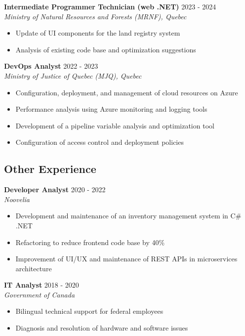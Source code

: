 ﻿\documentclass[11pt,letterpaper]{article}
\begin{document}
\newpage

\textbf{Intermediate Programmer Technician (web .NET)} \hfill 2023 - 2024\\
\textit{Ministry of Natural Resources and Forests (MRNF), Quebec}
\begin{itemize}
\item Update of UI components for the land registry system
\item Analysis of existing code base and optimization suggestions
\end{itemize}

\textbf{DevOps Analyst} \hfill 2022 - 2023\\
\textit{Ministry of Justice of Quebec (MJQ), Quebec}
\begin{itemize}
\item Configuration, deployment, and management of cloud resources on Azure
\item Performance analysis using Azure monitoring and logging tools
\item Development of a pipeline variable analysis and optimization tool
\item Configuration of access control and deployment policies
\end{itemize}

\subsection*{Other Experience}

\textbf{Developer Analyst} \hfill 2020 - 2022\\
\textit{Noovelia}
\begin{itemize}
\item Development and maintenance of an inventory management system in C\# .NET
\item Refactoring to reduce frontend code base by 40\%
\item Improvement of UI/UX and maintenance of REST APIs in microservices architecture
\end{itemize}

\textbf{IT Analyst} \hfill 2018 - 2020\\
\textit{Government of Canada}
\begin{itemize}
\item Bilingual technical support for federal employees
\item Diagnosis and resolution of hardware and software issues
\end{itemize}
\end{document}
